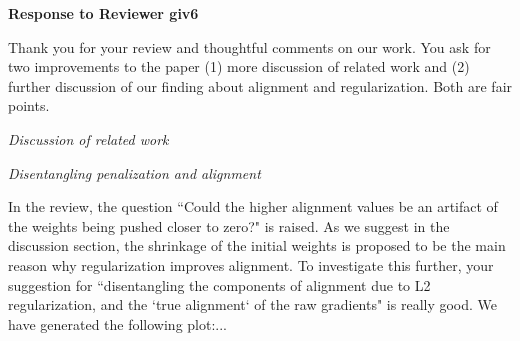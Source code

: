 
{\bf Response to Reviewer giv6}

Thank you for your review and thoughtful comments on our work. You ask for two improvements to the paper (1) more discussion of related work and (2) further discussion of our finding about alignment and regularization. Both are fair points.

{\it Discussion of related work}

{\it Disentangling penalization and alignment}

In the review, the question ``Could the higher alignment values be an artifact of the weights being pushed closer to zero?" is raised. As we suggest in the discussion section, the shrinkage of the initial weights is proposed to be the main reason why regularization improves alignment. To investigate this further, your suggestion for ``disentangling the components of alignment due to L2 regularization, and the `true alignment` of the raw gradients" is really good. We have generated the following plot:...




\clearpage

